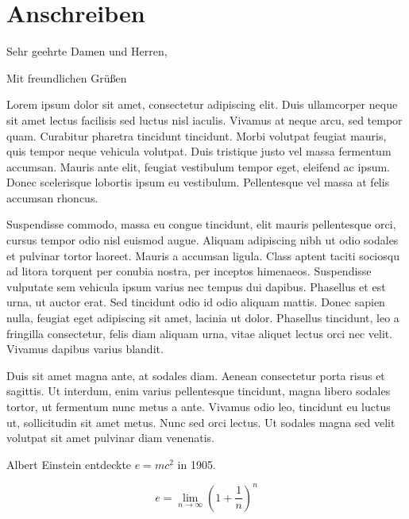 

\section{Anschreiben}\label{sec:anschreiben}
\opening{Sehr geehrte Damen und Herren,}
\closing{Mit freundlichen Grüßen}
\makelettertitle

Lorem ipsum dolor sit amet, consectetur adipiscing elit.
Duis ullamcorper neque sit amet lectus facilisis sed luctus nisl iaculis.
Vivamus at neque arcu, sed tempor quam.
Curabitur pharetra tincidunt tincidunt.
Morbi volutpat feugiat mauris, quis tempor neque vehicula volutpat.
Duis tristique justo vel massa fermentum accumsan.
Mauris ante elit, feugiat vestibulum tempor eget, eleifend ac ipsum.
Donec scelerisque lobortis ipsum eu vestibulum.
Pellentesque vel massa at felis accumsan rhoncus.

Suspendisse commodo, massa eu congue tincidunt, elit mauris pellentesque orci, cursus tempor odio nisl euismod augue.
Aliquam adipiscing nibh ut odio sodales et pulvinar tortor laoreet.
Mauris a accumsan ligula.
Class aptent taciti sociosqu ad litora torquent per conubia nostra, per inceptos himenaeos.
Suspendisse vulputate sem vehicula ipsum varius nec tempus dui dapibus.
Phasellus et est urna, ut auctor erat.
Sed tincidunt odio id odio aliquam mattis.
Donec sapien nulla, feugiat eget adipiscing sit amet, lacinia ut dolor.
Phasellus tincidunt, leo a fringilla consectetur, felis diam aliquam urna, vitae aliquet lectus orci nec velit.
Vivamus dapibus varius blandit.

Duis sit amet magna ante, at sodales diam.
Aenean consectetur porta risus et sagittis.
Ut interdum, enim varius pellentesque tincidunt, magna libero sodales tortor, ut fermentum nunc metus a ante.
Vivamus odio leo, tincidunt eu luctus ut, sollicitudin sit amet metus.
Nunc sed orci lectus.
Ut sodales magna sed velit volutpat sit amet pulvinar diam venenatis.

Albert Einstein entdeckte $e=mc^2$ in 1905.

\[ e=\lim_{n \to \infty} \left(1+\frac{1}{n}\right)^n \]

\makeletterclosing
